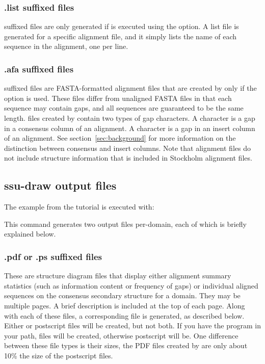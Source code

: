 \subsubsection{.list suffixed files}
 suffixed files are only generated if  is
executed using the  option. A list file is generated for
a specific alignment file, and it simply lists the name of each
sequence in the alignment, one per line.

\subsubsection{.afa suffixed files}
 suffixed files are FASTA-formatted alignment files that
are created by  only if the  option is
used. These files differ from unaligned FASTA files in that each
sequence may contain gaps, and all sequences are guaranteed to be
the same length.  files created by 
contain two types of gap characters. A \prog{-} character
is a gap in a consensus column of an alignment. A  character
is a gap in an insert column of an alignment. See
section~\ref{sec:background} for more information on the distinction
between consensus and insert columns. Note that  alignment
files do not include structure information that is included in
Stockholm alignment files.

\subsection{ssu-draw output files}

The  example from the tutorial is executed with:


This command generates two output files per-domain, each of which is 
briefly explained below. 

\subsubsection{.pdf or .ps suffixed files}
These are structure diagram files that display either alignment
summary statistics (such as information content or frequency of gaps)
or individual aligned sequences on the consensus secondary structure
for a domain. They may be multiple pages. A brief description is
included at the top of each page. Along with each of these files, a
corresponding  file is generated, as described below.
Either  or postscript  files will
be created, but not both. If you have the program  in
your path,  files will be created, otherwise postscript
will be. One difference between
these file types is their sizes, the PDF files created by
 are only about 10\% the size of the postscript files.

